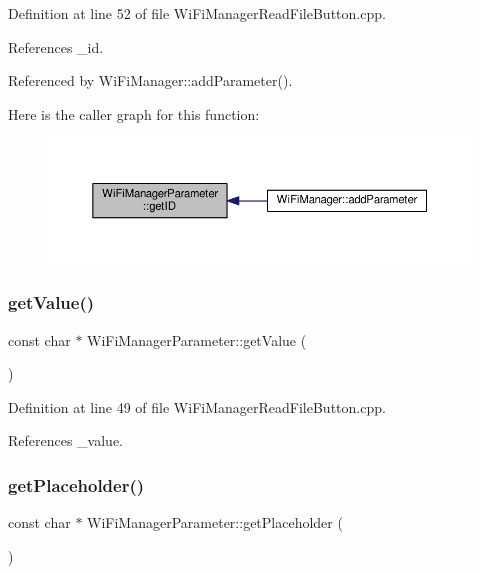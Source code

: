 Definition at line 52 of file Wi\+Fi\+Manager\+Read\+File\+Button.\+cpp.



References \+\_\+id.



Referenced by Wi\+Fi\+Manager\+::add\+Parameter().

Here is the caller graph for this function\+:
\nopagebreak
\begin{figure}[H]
\begin{center}
\leavevmode
\includegraphics[width=350pt]{d7/d08/class_wi_fi_manager_parameter_af57919615418fff788310ba9cc2664d8_icgraph}
\end{center}
\end{figure}
\mbox{\label{class_wi_fi_manager_parameter_a23d23709f466ef1c3c2535a39016ec0f}} 
\subsubsection{\texorpdfstring{get\+Value()}{getValue()}}
{\footnotesize\ttfamily const char $\ast$ Wi\+Fi\+Manager\+Parameter\+::get\+Value (\begin{DoxyParamCaption}{ }\end{DoxyParamCaption})}



Definition at line 49 of file Wi\+Fi\+Manager\+Read\+File\+Button.\+cpp.



References \+\_\+value.

\mbox{\label{class_wi_fi_manager_parameter_a69124c6f46876d1ede54177c692e3382}} 
\subsubsection{\texorpdfstring{get\+Placeholder()}{getPlaceholder()}}
{\footnotesize\ttfamily const char $\ast$ Wi\+Fi\+Manager\+Parameter\+::get\+Placeholder (\begin{DoxyParamCaption}{ }\end{DoxyParamCaption})}



